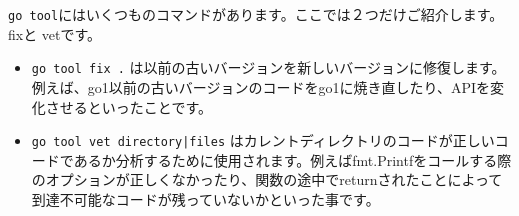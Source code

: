 \texttt{go tool}にはいくつものコマンドがあります。ここでは２つだけご紹介します。fixと vetです。


\begin{itemize}
  \item \texttt{go tool fix .} は以前の古いバージョンを新しいバージョンに修復します。例えば、go1以前の古いバージョンのコードをgo1に焼き直したり、APIを変化させるといったことです。
  \item \texttt{go tool vet directory|files} はカレントディレクトリのコードが正しいコードであるか分析するために使用されます。例えばfmt.Printfをコールする際のオプションが正しくなかったり、関数の途中でreturnされたことによって到達不可能なコードが残っていないかといった事です。
\end{itemize}
